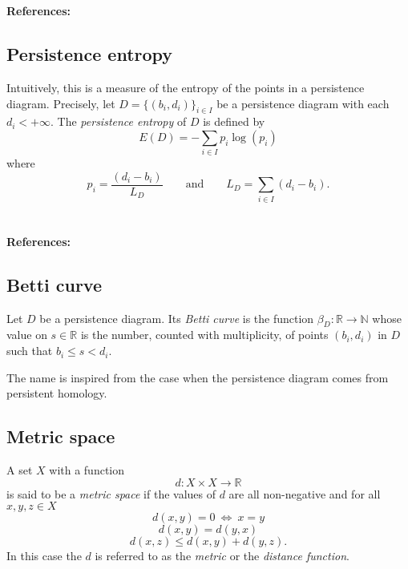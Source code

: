 \documentclass{amsart}
\begin{document}
	\paragraph{\\ References:} \cite{chazal2014stochastic}
	
	\subsection*{Persistence entropy} \label{persistence_entropy}
	
	Intuitively, this is a measure of the entropy of the points in a
	persistence diagram. Precisely, let $D = \{(b_i, d_i)\}_{i \in I}$ be a persistence diagram with each $d_i < +\infty$. The \textit{persistence entropy} of $D$ is defined by
	\begin{equation*}
	E(D) = - \sum_{i \in I} p_i \log(p_i)
	\end{equation*}
	where
	\begin{equation*}
	p_i = \frac{(d_i - b_i)}{L_D} \qquad \text{and} \qquad L_D = \sum_{i \in I} (d_i - b_i) . 
	\end{equation*}
	
	\paragraph{\\ References:} \cite{rucco2016characterisation}
	
	\subsection*{Betti curve} \label{betti_curve}
	
	Let $D$ be a 
	persistence diagram. Its \textit{Betti curve} is the function $\beta_D : \mathbb R \to \mathbb N$ whose value on $s \in \mathbb R$ is the number, counted with multiplicity, of points $(b_i,d_i)$ in $D$ such that $b_i \leq s <d_i$.
	
	The name is inspired from the case when the persistence diagram comes from persistent homology.
	
	\subsection*{Metric space} \label{metric_space}	
	A set $X$ with a function	
	\begin{equation*}	
	d : X \times X \to \mathbb R	
	\end{equation*}	
	is said to be a \textit{metric space} if the values of $d$ are all non-negative and for all $x,y,z \in X$
	\begin{equation*}	
	d(x,y) = 0\ \Leftrightarrow\ x = y	
	\end{equation*}	
	\begin{equation*}	
	d(x,y) = d(y,x)	
	\end{equation*}	
	\begin{equation*}	
	d(x,z) \leq d(x,y) + d(y, z).	
	\end{equation*}	
	In this case the $d$ is referred to as the \textit{metric} or the \textit{distance function}.	
	
\end{document}
